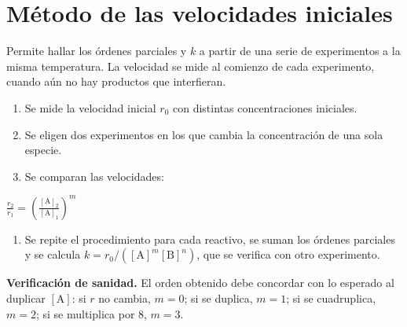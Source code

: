\documentclass[10pt,letterpaper]{article}
\newcommand{\A}{[\mathrm{A}]}
\newcommand{\B}{[\mathrm{B}]}
\begin{document}
\section{Método de las velocidades iniciales}
Permite hallar los órdenes parciales y $k$ a partir de una serie de experimentos a la misma temperatura. La velocidad
se mide al comienzo de cada experimento, cuando aún no hay productos que interfieran.

\vspace{2pt}
\begin{minipage}[t]{0.47\linewidth}\vspace{0pt}
\begin{enumerate}[label=\textbf{\arabic*.}]
\item Se mide la velocidad inicial $r_0$ con distintas concentraciones iniciales.
\item Se eligen dos experimentos en los que cambia la concentración de una sola especie.
\item Se comparan las velocidades:
\end{enumerate}
\begin{clave}
$\displaystyle \frac{r_2}{r_1}=\left(\frac{\A_2}{\A_1}\right)^{m}$
\end{clave}
\begin{enumerate}[label=\textbf{\arabic*.},start=4]
\item Se repite el procedimiento para cada reactivo, se suman los órdenes parciales y se calcula $k=r_0/(\A^{m}\B^{n})$, que
se verifica con otro experimento.
\end{enumerate}
\begin{nota}
\textbf{Verificación de sanidad.} El orden obtenido debe concordar con lo esperado al duplicar $\A$: si $r$ no cambia,
$m=0$; si se duplica, $m=1$; si se cuadruplica, $m=2$; si se multiplica por 8, $m=3$.
\end{nota}
\end{minipage}\hfill
\end{document}
